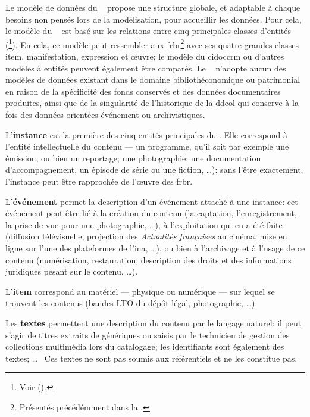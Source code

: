 Le modèle de données du \ldd~ propose une structure globale, et adaptable à chaque besoins non pensés lors de la modélisation, pour accueillir les données. Pour cela, le modèle du \ldd~ est basé sur les relations entre cinq principales classes d'entités (\footnote{Voir  ().}). En cela, ce modèle peut ressembler aux \ac{frbr}\footnote{Présentés précédémment dans la .} avec ses quatre grandes classes item, manifestation, expression et œuvre; le modèle du \ac{cidoccrm} ou d'autres modèles à entités peuvent également être comparés. Le \ldd~ n'adopte aucun des modèles de données existant dans le domaine bibliothéconomique ou patrimonial en raison de la spécificité des fonds conservés et des données documentaires produites, ainsi que de la singularité de l'historique de la \ac{ddcol} qui conserve à la fois des données orientées événement ou archivistiques.


\noindent L'\textbf{instance} est la première des cinq entités principales du \ldd. Elle correspond à l'entité intellectuelle du contenu --- un programme, qu'il soit par exemple une émission, ou bien un reportage; une photographie; une documentation d'accompagnement, un épisode de série ou une fiction, \dots): sans l'être exactement, l'instance peut être rapprochée de l'œuvre des \ac{frbr}.


\noindent L'\textbf{événement} permet la description d'un événement attaché à une instance: cet événement peut être lié à la création du contenu (la captation, l'enregistrement, la prise de vue pour une photographie, \dots), à l'exploitation qui en a été faite (diffusion télévisuelle, projection des \textit{Actualités françaises} au cinéma, mise en ligne sur l'une des plateformes de l'\ac{ina}, \dots), ou bien à l'archivage et à l'usage de ce contenu (numérisation, restauration, description des droits et des informations juridiques pesant sur le contenu, \dots).

\noindent L'\textbf{item} correspond au matériel --- physique ou numérique --- sur lequel se trouvent les contenus (bandes LTO du dépôt légal, photographie, \dots).

\noindent Les \textbf{textes} permettent une description du contenu par le langage naturel: il peut s'agir de titres extraits de génériques ou saisis par le technicien de gestion des collections multimédia lors du catalogage; les identifiants sont également des textes; \dots ~ Ces textes ne sont pas soumis aux référentiels et ne les constitue pas.

